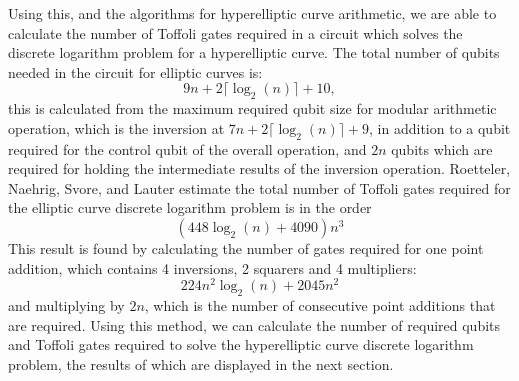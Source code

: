 Using this, and the algorithms for hyperelliptic curve arithmetic, we are able to calculate the number of Toffoli gates required in a circuit which solves the discrete logarithm problem for a hyperelliptic curve. The total number of qubits needed in the circuit for elliptic curves is: 
$$9n+2\lceil\log_2(n)\rceil + 10,$$ this is calculated from the maximum required qubit size for modular arithmetic operation, which is the inversion at $7n+2\lceil\log_2(n)\rceil + 9$, in addition to a qubit required for the control qubit of the overall operation, and $2n$ qubits which are required for holding the intermediate results of the inversion operation. Roetteler, Naehrig, Svore, and Lauter estimate the total number of Toffoli gates required for the elliptic curve discrete logarithm problem is in the order 
$$(448\log_2(n)+4090)n^3$$
This result is found by calculating the number of gates required for one point addition, which contains 4 inversions, 2 squarers and 4 multipliers:
$$224n^2\log_2(n) + 2045n^2$$
and multiplying by $2n$, which is the number of consecutive point additions that are required.
Using this method, we can calculate the number of required qubits and Toffoli gates required to solve the hyperelliptic curve discrete logarithm problem, the results of which are displayed in the next section.